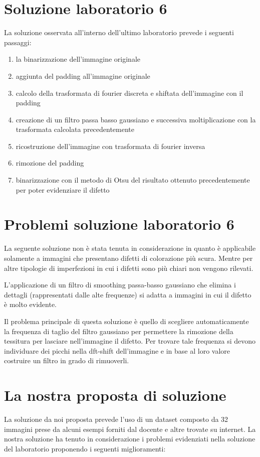 \documentclass{article}
\begin{document}
\newpage

\section{Soluzione laboratorio 6 }
La soluzione osservata all'interno dell'ultimo laboratorio prevede
i seguenti passaggi:
\begin{enumerate}
    \item la binarizzazione dell'immagine originale
    \item aggiunta del padding all'immagine originale
    \item calcolo della trasformata di fourier discreta e shiftata dell'immagine con il padding
    \item creazione di un filtro passa basso gaussiano e successiva moltiplicazione con la trasformata calcolata precedentemente
    \item ricostruzione dell'immagine con trasformata di fourier inversa
    \item rimozione del padding
    \item binarizzazione con il metodo di Otsu del risultato ottenuto precedentemente per poter evidenziare il difetto
\end{enumerate}

\section{Problemi soluzione laboratorio 6}
La seguente soluzione non è stata tenuta in considerazione in quanto è applicabile solamente a immagini che presentano difetti di colorazione più scura. Mentre per altre tipologie di imperfezioni in cui i difetti sono più chiari non vengono rilevati.  

L'applicazione di un filtro di smoothing passa-basso gaussiano che elimina i dettagli (rappresentati dalle alte frequenze) si adatta a immagini in cui il difetto è molto evidente.

Il problema principale di questa soluzione è quello di scegliere automaticamente la frequenza di taglio del filtro gaussiano per permettere la rimozione della tessitura per lasciare nell'immagine il difetto. Per trovare tale frequenza si devono individuare dei picchi nella dft-shift dell'immagine e in base al loro valore costruire un filtro in grado di rimuoverli.

\section{La nostra proposta di soluzione}
La soluzione da noi proposta prevede l'uso di un dataset composto da 32 immagini prese da alcuni esempi forniti dal docente e altre trovate su internet.
La nostra soluzione ha tenuto in considerazione i problemi evidenziati nella soluzione del laboratorio proponendo i seguenti miglioramenti:
\end{document}
